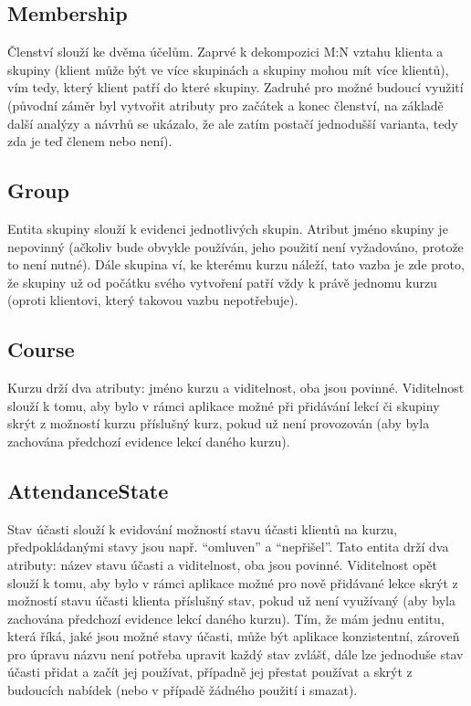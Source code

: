         \subsection{Membership}
        Členství slouží ke dvěma účelům. Zaprvé k dekompozici M:N vztahu klienta a skupiny (klient může být ve více skupinách a skupiny mohou mít více klientů), vím tedy, který klient patří do které skupiny. Zadruhé pro možné budoucí využití (původní záměr byl vytvořit atributy pro začátek a konec členství, na základě další analýzy a návrhů se ukázalo, že ale zatím postačí jednodušší varianta, tedy zda je teď členem nebo není).
        
        \subsection{Group}
        Entita skupiny slouží k evidenci jednotlivých skupin. Atribut jméno skupiny je nepovinný (ačkoliv bude obvykle používán, jeho použití není vyžadováno, protože to není nutné). Dále skupina ví, ke kterému kurzu náleží, tato vazba je zde proto, že skupiny už od počátku svého vytvoření patří vždy k právě jednomu kurzu (oproti klientovi, který takovou vazbu nepotřebuje).
        
        \subsection{Course}
        Kurzu drží dva atributy: jméno kurzu a viditelnost, oba jsou povinné. Viditelnost slouží k tomu, aby bylo v rámci aplikace možné při přidávání lekcí či skupiny skrýt z možností kurzu příslušný kurz, pokud už není provozován (aby byla zachována předchozí evidence lekcí daného kurzu).
        
        \subsection{AttendanceState}
        Stav účasti slouží k evidování možností stavu účasti klientů na kurzu, předpokládanými stavy jsou např. \enquote{omluven} a \enquote{nepřišel}. Tato entita drží dva atributy: název stavu účasti a viditelnost, oba jsou povinné. Viditelnost opět slouží k tomu, aby bylo v rámci aplikace možné pro nově přidávané lekce skrýt z možností stavu účasti klienta příslušný stav, pokud už není využívaný (aby byla zachována předchozí evidence lekcí daného kurzu). Tím, že mám jednu entitu, která říká, jaké jsou možné stavy účasti, může být aplikace konzistentní, zároveň pro úpravu názvu není potřeba upravit každý stav zvlášť, dále lze jednoduše stav účasti přidat a začít jej používat, případně jej přestat používat a skrýt z budoucích nabídek (nebo v případě žádného použití i smazat).
        
